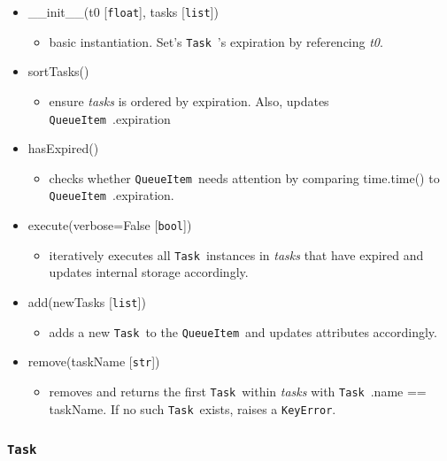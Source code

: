 \documentclass{article}
\newcommand{\QueueItem}{\texttt{QueueItem}~}
\newcommand{\Task}{\texttt{Task}~}
\begin{document}
\begin{itemize}
    \item{\_\_init\_\_(t0 [\texttt{float}], tasks [\texttt{list}])
        \begin{itemize}
            \item{basic instantiation. Set's \Task's expiration by referencing \textit{t0}.}
        \end{itemize}
         }
    \item{sortTasks()
        \begin{itemize}
            \item{ensure \textit{tasks} is ordered by expiration. Also, updates \QueueItem.expiration}
        \end{itemize}
         }
    \item{hasExpired()
        \begin{itemize}
            \item{checks whether \QueueItem needs attention by comparing time.time() to \QueueItem.expiration.}
        \end{itemize}
         }
    \item{execute(verbose=False [\texttt{bool}])
        \begin{itemize}
            \item{iteratively executes all \Task instances in \textit{tasks} that have expired and updates internal storage accordingly.}
        \end{itemize}
         }
    \item{add(newTasks [\texttt{list}])
        \begin{itemize}
            \item{adds a new \Task to the \QueueItem and updates attributes accordingly.}
        \end{itemize}
         }
    \item{remove(taskName [\texttt{str}])
        \begin{itemize}
            \item{removes and returns the first \Task within \textit{tasks} with \Task.name == taskName. If no such \Task exists, raises a \texttt{KeyError}.}
        \end{itemize}
         }
\end{itemize}


\subsubsection{\Task}
\label{sec: Task}
\end{document}
